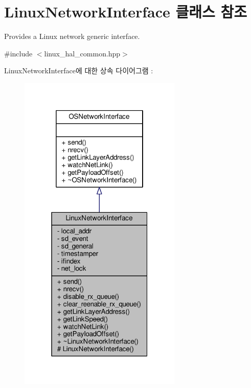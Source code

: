 \hypertarget{class_linux_network_interface}{}\section{Linux\+Network\+Interface 클래스 참조}
\label{class_linux_network_interface}


Provides a Linux network generic interface.  




{\ttfamily \#include $<$linux\+\_\+hal\+\_\+common.\+hpp$>$}



Linux\+Network\+Interface에 대한 상속 다이어그램 \+: 
\nopagebreak
\begin{figure}[H]
\begin{center}
\leavevmode
\includegraphics[width=220pt]{class_linux_network_interface__inherit__graph}
\end{center}
\end{figure}


